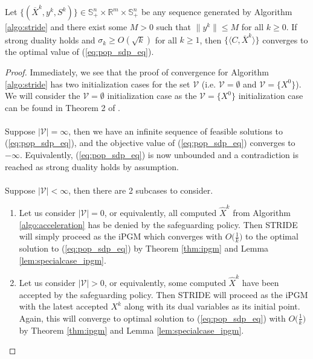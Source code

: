 \documentclass[12pt]{l4dc2021}
\begin{document}
    \begin{theorem} \label{thm:stride_convergence}
        Let $\{(\overline{X}^k,y^k,S^k)\} \in \mathbb{S}_+^n \times \mathbb{R}^m \times \mathbb{S}_+^n$ be any sequence generated by Algorithm \ref{algo:stride} and there exist some $M > 0$  such that $\|y^k\| \le M$ for all $k \ge 0$. If strong duality holds and $\sigma_k \ge O(\sqrt{k})$ for all $k \ge 1$, then $\{\langle C, \overline{X}^k \rangle\}$ converges to the optimal value of (\ref{eq:pop_sdp_eq}).
    \end{theorem}

    \begin{proof}
        Immediately, we see that the proof of convergence for Algorithm \ref{algo:stride} has two initialization cases for the set $\mathcal{V}$ (i.e. $\mathcal{V} = \emptyset$ and $\mathcal{V} = \{X^0\}$). We will consider the $\mathcal{V} = \emptyset$ initialization case as the $\mathcal{V} = \{X^0\}$ initialization case can be found in Theorem 2 of \cite{yang2021inexact}.
        \\\\
        Suppose $|\mathcal{V}| = \infty$, then we have an infinite sequence of feasible solutions to (\ref{eq:pop_sdp_eq}), and the objective value of (\ref{eq:pop_sdp_eq}) converges to $-\infty$. Equivalently, (\ref{eq:pop_sdp_eq}) is now unbounded and a contradiction is reached as strong duality holds by assumption.
        \\\\
        Suppose $|\mathcal{V}| < \infty$, then there are 2 subcases to consider. 
        \begin{enumerate}
            \item Let us consider $|\mathcal{V}| = 0$, or equivalently, all computed $\hat{X}^k$ from Algorithm \ref{algo:acceleration} has be denied by the safeguarding policy. Then STRIDE will simply proceed as the iPGM which converges with $O\big(\frac{1}{k}\big)$ to the optimal solution to (\ref{eq:pop_sdp_eq}) by Theorem \ref{thm:ipgm} and Lemma \ref{lem:specialcase_ipgm}.

            \item Let us consider $|\mathcal{V}| > 0$, or equivalently, some computed $\hat{X}^k$ have been accepted by the safeguarding policy. Then STRIDE will proceed as the iPGM with the latest accepted $X^k$ along with its dual variables as its initial point. Again, this will converge to optimal solution to (\ref{eq:pop_sdp_eq}) with $O\big(\frac{1}{k}\big)$ by Theorem \ref{thm:ipgm} and Lemma \ref{lem:specialcase_ipgm}.
        \end{enumerate}
    \end{proof}
\end{document}
